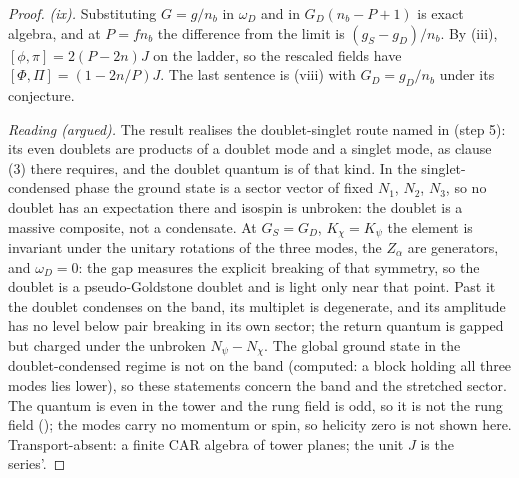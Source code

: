 \begin{proof}
\emph{(ix).} Substituting $G = g/n_{b}$ in $\omega_{D}$ and in $G_{D}(n_{b} - P + 1)$ is exact algebra, and at $P = fn_{b}$ the difference from the limit is $(g_{S} - g_{D})/n_{b}$. By (iii), $[\phi, \pi] = 2(P - 2n)J$ on the ladder, so the rescaled fields have $[\Phi, \Pi] = (1 - 2n/P)J$. The last sentence is (viii) with $G_{D} = g_{D}/n_{b}$ under its conjecture.

\emph{Reading (argued).} The result realises the doublet-singlet route named in  (step 5): its even doublets are products of a doublet mode and a singlet mode, as clause (3) there requires, and the doublet quantum is of that kind. In the singlet-condensed phase the ground state is a sector vector of fixed $N_{1}$, $N_{2}$, $N_{3}$, so no doublet has an expectation there and isospin is unbroken: the doublet is a massive composite, not a condensate. At $G_{S} = G_{D}$, $K_{\chi} = K_{\psi}$ the element is invariant under the unitary rotations of the three modes, the $Z_{\alpha}$ are generators, and $\omega_{D} = 0$: the gap measures the explicit breaking of that symmetry, so the doublet is a pseudo-Goldstone doublet and is light only near that point. Past it the doublet condenses on the band, its multiplet is degenerate, and its amplitude has no level below pair breaking in its own sector; the return quantum is gapped but charged under the unbroken $N_{\psi} - N_{\chi}$. The global ground state in the doublet-condensed regime is not on the band (computed: a block holding all three modes lies lower), so these statements concern the band and the stretched sector. The quantum is even in the tower and the rung field is odd, so it is not the rung field (); the modes carry no momentum or spin, so helicity zero is not shown here. Transport-absent: a finite CAR algebra of tower planes; the unit $J$ is the series'.
\end{proof}

